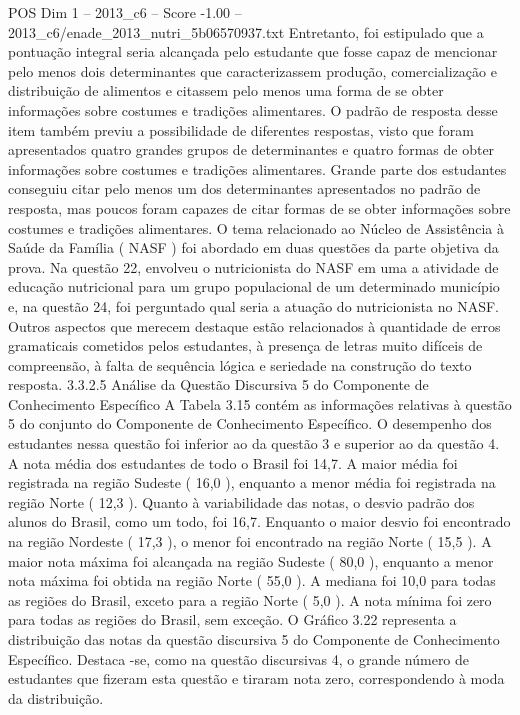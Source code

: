 \begin{textsample}{POS Dim 1 – 2013\_c6 – Score -1.00 – 2013\_c6/enade\_2013\_nutri\_5b06570937.txt}
Entretanto, foi estipulado que a pontuação integral seria alcançada pelo estudante que fosse capaz de mencionar pelo menos dois determinantes que caracterizassem produção, comercialização e distribuição de alimentos e citassem pelo menos uma forma de se obter informações sobre costumes e tradições alimentares.
O padrão de resposta desse item também previu a possibilidade de diferentes respostas, visto que foram apresentados quatro grandes grupos de determinantes e quatro formas de obter informações sobre costumes e tradições alimentares.
Grande parte dos estudantes conseguiu citar pelo menos um dos determinantes apresentados no padrão de resposta, mas poucos foram capazes de citar formas de se obter informações sobre costumes e tradições alimentares.
O tema relacionado ao Núcleo de Assistência à Saúde da Família ( NASF ) foi abordado em duas questões da parte objetiva da prova.
Na questão 22, envolveu o nutricionista do NASF em uma a atividade de educação nutricional para um grupo populacional de um determinado município e, na questão 24, foi perguntado qual seria a atuação do nutricionista no NASF.
Outros aspectos que merecem destaque estão relacionados à quantidade de erros gramaticais cometidos pelos estudantes, à presença de letras muito difíceis de compreensão, à falta de sequência lógica e seriedade na construção do texto resposta. 3.3.2.5 Análise da Questão Discursiva 5 do Componente de Conhecimento Específico A Tabela 3.15 contém as informações relativas à questão 5 do conjunto do Componente de Conhecimento Específico.
O desempenho dos estudantes nessa questão foi inferior ao da questão 3 e superior ao da questão 4.
A nota média dos estudantes de todo o Brasil foi 14,7.
A maior média foi registrada na região Sudeste ( 16,0 ), enquanto a menor média foi registrada na região Norte ( 12,3 ).
Quanto à variabilidade das notas, o desvio padrão dos alunos do Brasil, como um todo, foi 16,7.
Enquanto o maior desvio foi encontrado na região Nordeste ( 17,3 ), o menor foi encontrado na região Norte ( 15,5 ).
A maior nota máxima foi alcançada na região Sudeste ( 80,0 ), enquanto a menor nota máxima foi obtida na região Norte ( 55,0 ).
A mediana foi 10,0 para todas as regiões do Brasil, exceto para a região Norte ( 5,0 ).
A nota mínima foi zero para todas as regiões do Brasil, sem exceção.
O Gráfico 3.22 representa a distribuição das notas da questão discursiva 5 do Componente de Conhecimento Específico.
Destaca -se, como na questão discursivas 4, o grande número de estudantes que fizeram esta questão e tiraram nota zero, correspondendo à moda da distribuição.

\end{textsample}

